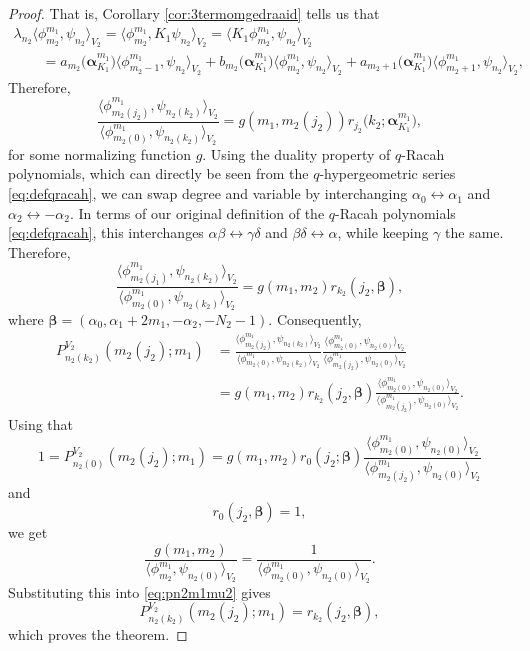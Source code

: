 \documentclass[pdftex]{sigma}
\numberwithin{equation}{section}
\begin{document}
\begin{proof}
	That is, Corollary \ref{cor:3termomgedraaid} tells us that
	\begin{gather*}
		\lambda_{n_2} \big\langle \phi_{m_2}^{m_1},\psi_{n_2}\big\rangle _{V_2} = \big\langle \phi_{m_2}^{m_1},K_1\psi_{n_2}\big\rangle _{V_2} = \big\langle K_1\phi_{m_2}^{m_1},\psi_{n_2}\big\rangle _{V_2} \\
		\qquad{} =a_{m_2}\big(\bm{\alpha}_{K_1}^{m_1}\big)\big\langle \phi_{m_2-1}^{m_1},\psi_{n_2}\big\rangle _{V_2}+b_{m_2}\big(\bm{\alpha}_{K_1}^{m_1}\big) \big\langle \phi_{m_2}^{m_1},\psi_{n_2}\big\rangle _{V_2}+a_{m_2+1}\big(\bm{\alpha}_{K_1}^{m_1}\big)\big\langle \phi_{m_2+1}^{m_1},\psi_{n_2}\big\rangle _{V_2},
	\end{gather*}
	Therefore,
	\[
	\frac{\big\langle \phi_{m_2(j_2)}^{m_1}, \psi_{n_2(k_2)}\big\rangle _{ V_2}}{\big\langle \phi_{m_2(0)}^{m_1}, \psi_{n_2(k_2)}\big\rangle _{ V_2}}=g(m_1,m_2(j_2))r_{j_2}\big(k_2;\bm{\alpha}_{K_1}^{m_1}\big),
	\]
for some normalizing function $g$. Using the duality property of $q$-Racah polynomials, which can directly be seen from the $q$-hypergeometric series \eqref{eq:defqracah}, we can swap degree and variable by interchanging $\alpha_0\leftrightarrow\alpha_1$ and $\alpha_2\leftrightarrow-\alpha_2$. In terms of our original definition of the $q$-Racah polynomials \eqref{eq:defqracah}, this interchanges $\alpha\beta\leftrightarrow\gamma\delta$ and $\beta\delta\leftrightarrow\alpha$, while keeping $\gamma$ the same. Therefore,
	\[
	\frac{\big\langle \phi_{m_2(j_1)}^{m_1}, \psi_{n_2(k_2)}\big\rangle _{ V_2}}{\big\langle \phi_{m_2(0)}^{m_1}, \psi_{n_2(k_2)}\big\rangle _{ V_2}}=g(m_1,m_2)r_{k_2}(j_2,\bm{\beta}),
	\]
	where $\bm{\beta}=(\alpha_0,\alpha_1+2m_1,-\alpha_2,-N_2-1)$. Consequently,
	\begin{align}
		P_{n_2(k_2)}^{V_2}(m_2(j_2);m_1)& = \frac{\big\langle \phi_{m_2(j_2)}^{m_1},\psi_{n_2(k_2)}\big\rangle _{ V_2}}{\big\langle \phi_{m_2(0)}^{m_1}, \psi_{n_2(k_2)}\big\rangle _{ V_2}}\frac{\big\langle \phi_{m_2(0)}^{m_1}, \psi_{n_2(0)}\big\rangle _{ V_2}}{\big\langle \phi_{m_2(j_2)}^{m_1}, \psi_{n_2(0)}\big\rangle _{ V_2}} \nonumber\\
		&= g(m_1,m_2)r_{k_2}(j_2,\bm{\beta})\frac{\big\langle \phi_{m_2(0)}^{m_1}, \psi_{n_2(0)}\big\rangle _{ V_2}}{\big\langle \phi_{m_2(j_2)}^{m_1}, \psi_{n_2(0)}\big\rangle _{ V_2}}.\label{eq:pn2m1mu2}
	\end{align}
	Using that
	\[
	1=P_{n_2(0)}^{V_2}(m_2(j_2);m_1)= g(m_1,m_2)r_{0}(j_2;\bm{\beta})\frac{\big\langle \phi_{m_2(0)}^{m_1}, \psi_{n_2(0)}\big\rangle _{ V_2}}{\big\langle \phi_{m_2(j_2)}^{m_1}, \psi_{n_2(0)}\big\rangle _{ V_2}}
	\]
	and
	\[
	r_{0}(j_2,\bm{\beta})=1,
	\]
	we get
	\[
	\frac{g(m_1,m_2)}{\big\langle \phi_{m_2}^{m_1}, \psi_{n_2(0)}\big\rangle _{ V_2}}=\frac{1}{\big\langle \phi_{m_2(0)}^{m_1}, \psi_{n_2(0)}\big\rangle _{ V_2}}.
	\]
	Substituting this into \eqref{eq:pn2m1mu2} gives
	\[
	P_{n_2(k_2)}^{V_2}(m_2(j_2);m_1)= r_{k_2}(j_2,\bm{\beta}) ,
	\]
	which proves the theorem.
\end{proof}
\end{document}
